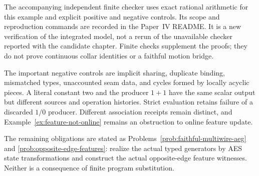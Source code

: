 The accompanying independent finite checker uses exact rational arithmetic for
this example and explicit positive and negative controls.  Its scope and
reproduction commands are recorded in the Paper~IV README.  It is a new
verification of the integrated model, not a rerun of the unavailable checker
reported with the candidate chapter.  Finite checks supplement the proofs;
they do not prove continuous collar identities or a faithful motion bridge.

The important negative controls are implicit sharing, duplicate binding,
mismatched types, unaccounted seam data, and cycles formed by locally acyclic
pieces.  A literal constant two and the producer $1+1$ have the same scalar
output but different sources and operation histories.  Strict evaluation
retains failure of a discarded $1/0$ producer.  Different association receipts
remain distinct, and Example~\ref{ex:feature-not-online} remains an obstruction
to online feature update.

The remaining obligations are stated as
Problems~\ref{prob:faithful-multiwire-aeg} and
\ref{prob:opposite-edge-features}: realize the actual typed generators by AES
state transformations and construct the actual opposite-edge feature
witnesses.  Neither is a consequence of finite program substitution.
